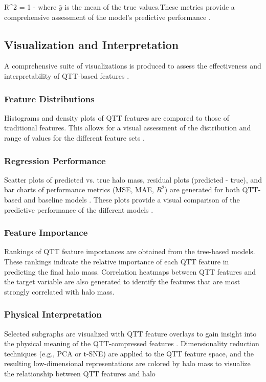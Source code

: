 \documentclass[twocolumn]{aastex631}
\begin{document}
\[\]R^2 = 1 -   \citep{narkedimilli2024predictingstellarmetallicitycomparative,raghav2024photometricanalysispredictingstar}\]where \(\bar{y}\) is the mean of the true values.These metrics provide a comprehensive assessment of the model's predictive performance  \citep{huppenkothen2023constructingimpactfulmachinelearning,raghav2024photometricanalysispredictingstar}.\subsection{Visualization and Interpretation}A comprehensive suite of visualizations is produced to assess the effectiveness and interpretability of QTT-based features \citep{shi2025machinelearningpipelinehunting,donosooliva2025astromer2,yang2025blackholemimickersshapirofree}.\subsubsection{Feature Distributions}Histograms and density plots of QTT features are compared to those of traditional features. This allows for a visual assessment of the distribution and range of values for the different feature sets  \citep{newburger2023comparingoverlappingdatadistributions,niu2025comparativeanalysisemceegaussian}.\subsubsection{Regression Performance}Scatter plots of predicted vs. true halo mass, residual plots (predicted - true), and bar charts of performance metrics (MSE, MAE, \(R^2\)) are generated for both QTT-based and baseline models  \citep{larson2024predictingdarkmatterhalo,zhao2025halosgalaxiesviimproved}. These plots provide a visual comparison of the predictive performance of the different models  \citep{larson2024predictingdarkmatterhalo}.\subsubsection{Feature Importance}Rankings of QTT feature importances are obtained from the tree-based models. These rankings indicate the relative importance of each QTT feature in predicting the final halo mass. Correlation heatmaps between QTT features and the target variable are also generated to identify the features that are most strongly correlated with halo mass.\subsubsection{Physical Interpretation}Selected subgraphs are visualized with QTT feature overlays to gain insight into the physical meaning of the QTT-compressed features  \citep{ye2024quantizedtensornetworkssolving}. Dimensionality reduction techniques (e.g., PCA or t-SNE) are applied to the QTT feature space, and the resulting low-dimensional representations are colored by halo mass to visualize the relationship between QTT features and halo \]
\end{document}
